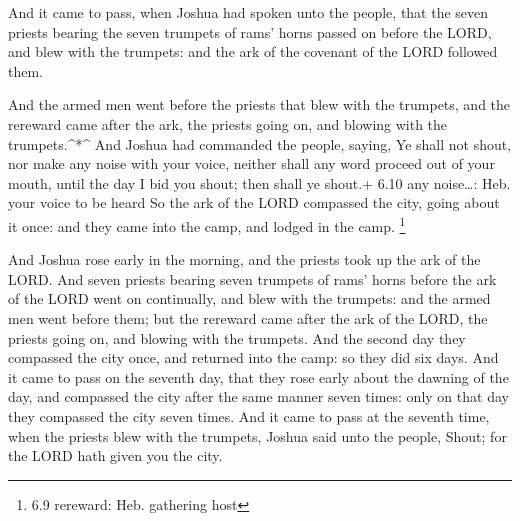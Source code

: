  And it came to pass, when Joshua had spoken unto the
people, that the seven priests bearing the seven trumpets of rams' horns
passed on before the LORD, and blew with the trumpets: and the ark of
the covenant of the LORD followed them.

 And the armed men went before the priests that blew with
the trumpets, and the rereward came after the ark, the priests going on,
and blowing with the trumpets.\^{}*\^{}  And Joshua had
commanded the people, saying, Ye shall not shout, nor make any noise
with your voice, neither shall any word proceed out of your mouth, until
the day I bid you shout; then shall ye shout.+ 6.10 any noise\ldots:
Heb. your voice to be heard  So the ark of the LORD
compassed the city, going about it once: and they came into the camp,
and lodged in the camp. \footnote{6.9 rereward: Heb. gathering host}

 And Joshua rose early in the morning, and the priests took
up the ark of the LORD.  And seven priests bearing seven
trumpets of rams' horns before the ark of the LORD went on continually,
and blew with the trumpets: and the armed men went before them; but the
rereward came after the ark of the LORD, the priests going on, and
blowing with the trumpets.  And the second day they
compassed the city once, and returned into the camp: so they did six
days.  And it came to pass on the seventh day, that they
rose early about the dawning of the day, and compassed the city after
the same manner seven times: only on that day they compassed the city
seven times.  And it came to pass at the seventh time, when
the priests blew with the trumpets, Joshua said unto the people, Shout;
for the LORD hath given you the city.

